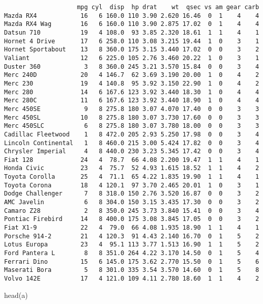 \documentclass[
  letterpaper,
  DIV=11,
  numbers=noendperiod]{scrartcl}
\newenvironment{Shaded}{\begin{snugshade}}{\end{snugshade}}
\newcommand{\FunctionTok}[1]{\textcolor[rgb]{0.28,0.35,0.67}{#1}}
\newcommand{\NormalTok}[1]{\textcolor[rgb]{0.00,0.23,0.31}{#1}}
\begin{document}
\begin{verbatim}
                    mpg cyl  disp  hp drat    wt  qsec vs am gear carb
Mazda RX4            16   6 160.0 110 3.90 2.620 16.46  0  1    4    4
Mazda RX4 Wag        16   6 160.0 110 3.90 2.875 17.02  0  1    4    4
Datsun 710           19   4 108.0  93 3.85 2.320 18.61  1  1    4    1
Hornet 4 Drive       17   6 258.0 110 3.08 3.215 19.44  1  0    3    1
Hornet Sportabout    13   8 360.0 175 3.15 3.440 17.02  0  0    3    2
Valiant              12   6 225.0 105 2.76 3.460 20.22  1  0    3    1
Duster 360            3   8 360.0 245 3.21 3.570 15.84  0  0    3    4
Merc 240D            20   4 146.7  62 3.69 3.190 20.00  1  0    4    2
Merc 230             19   4 140.8  95 3.92 3.150 22.90  1  0    4    2
Merc 280             14   6 167.6 123 3.92 3.440 18.30  1  0    4    4
Merc 280C            11   6 167.6 123 3.92 3.440 18.90  1  0    4    4
Merc 450SE            9   8 275.8 180 3.07 4.070 17.40  0  0    3    3
Merc 450SL           10   8 275.8 180 3.07 3.730 17.60  0  0    3    3
Merc 450SLC           6   8 275.8 180 3.07 3.780 18.00  0  0    3    3
Cadillac Fleetwood    1   8 472.0 205 2.93 5.250 17.98  0  0    3    4
Lincoln Continental   1   8 460.0 215 3.00 5.424 17.82  0  0    3    4
Chrysler Imperial     4   8 440.0 230 3.23 5.345 17.42  0  0    3    4
Fiat 128             24   4  78.7  66 4.08 2.200 19.47  1  1    4    1
Honda Civic          23   4  75.7  52 4.93 1.615 18.52  1  1    4    2
Toyota Corolla       25   4  71.1  65 4.22 1.835 19.90  1  1    4    1
Toyota Corona        18   4 120.1  97 3.70 2.465 20.01  1  0    3    1
Dodge Challenger      7   8 318.0 150 2.76 3.520 16.87  0  0    3    2
AMC Javelin           6   8 304.0 150 3.15 3.435 17.30  0  0    3    2
Camaro Z28            2   8 350.0 245 3.73 3.840 15.41  0  0    3    4
Pontiac Firebird     14   8 400.0 175 3.08 3.845 17.05  0  0    3    2
Fiat X1-9            22   4  79.0  66 4.08 1.935 18.90  1  1    4    1
Porsche 914-2        21   4 120.3  91 4.43 2.140 16.70  0  1    5    2
Lotus Europa         23   4  95.1 113 3.77 1.513 16.90  1  1    5    2
Ford Pantera L        8   8 351.0 264 4.22 3.170 14.50  0  1    5    4
Ferrari Dino         15   6 145.0 175 3.62 2.770 15.50  0  1    5    6
Maserati Bora         5   8 301.0 335 3.54 3.570 14.60  0  1    5    8
Volvo 142E           17   4 121.0 109 4.11 2.780 18.60  1  1    4    2
\end{verbatim}

\begin{Shaded}
\begin{Highlighting}[]
\FunctionTok{head}\NormalTok{(a)}
\end{Highlighting}
\end{Shaded}
\end{document}
